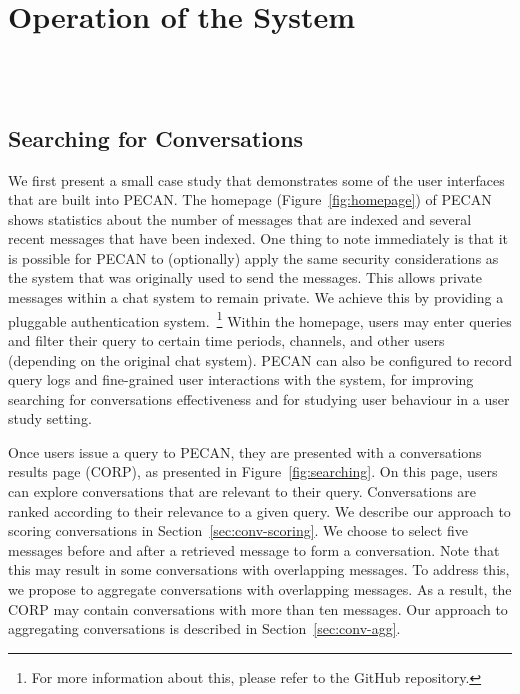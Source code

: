 \graphicspath{ {./images/} }
\section{Operation of the System}

\\
\\

\subsection{Searching for Conversations}

We first present a small case study that demonstrates some of the user interfaces that are built into PECAN. The homepage (Figure~\ref{fig:homepage}) of PECAN shows statistics about the number of messages that are indexed and several recent messages that have been indexed. One thing to note immediately is that it is possible for PECAN to (optionally) apply the same security considerations as the system that was originally used to send the messages. This allows private messages within a chat system to remain private. We achieve this by providing a pluggable authentication system.~\footnote{For more information about this, please refer to the GitHub repository.} Within the homepage, users may enter queries and filter their query to certain time periods, channels, and other users (depending on the original chat system). PECAN can also be configured to record query logs and fine-grained user interactions with the system, for improving searching for conversations effectiveness and for studying user behaviour in a user study setting.

Once users issue a query to PECAN, they are presented with a conversations results page (CORP), as presented in Figure~\ref{fig:searching}. On this page, users can explore conversations that are relevant to their query. Conversations are ranked according to their relevance to a given query. We describe our approach to scoring conversations in Section~\ref{sec:conv-scoring}. We choose to select five messages before and after a retrieved message to form a conversation. Note that this may result in some conversations with overlapping messages. To address this, we propose to aggregate conversations with overlapping messages. As a result, the CORP may contain conversations with more than ten messages. Our approach to aggregating conversations is described in Section~\ref{sec:conv-agg}.

